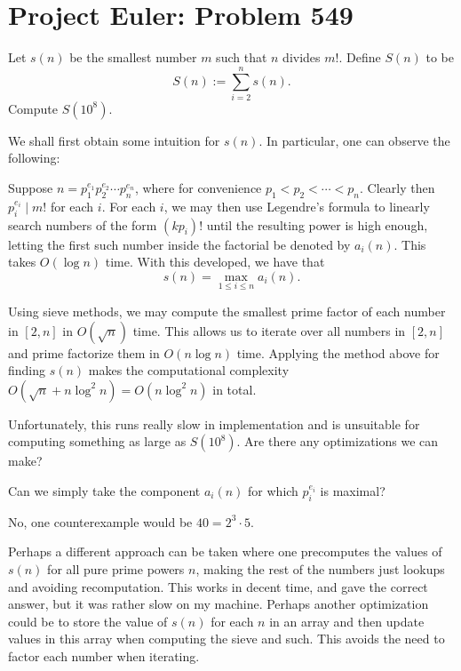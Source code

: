 \documentclass[a4paper, 12pt]{article}
\begin{document}
\section*{Project Euler: Problem 549}

\begin{chirpbox}
\begin{problem}
    Let \( s(n) \) be the smallest number \( m \) such that \( n \) divides \( m! \). Define \( S(n) \) to be
    \[
        S(n) := \sum_{i = 2}^{n} s(n)
    .\]
    Compute \( S(10^8) \).
\end{problem}
\end{chirpbox}

\begin{solution}
    We shall first obtain some intuition for \( s(n) \). In particular, one can observe the following:
    \begin{observation}
        Suppose \( n = p_1^{e_1} p_2^{e_2} \cdots p_n^{e_n} \), where for convenience \( p_1 < p_2 < \cdots < p_n \). Clearly then \( p_i^{e_i} \mid m! \) for each \( i \). For each \( i \), we may then use Legendre's formula to linearly search numbers of the form \( (kp_i)! \) until the resulting power is high enough, letting the first such number inside the factorial be denoted by \( a_i(n) \). This takes \( O(\log n) \) time. With this developed, we have that
        \[
            s(n) = \max_{1 \le i \le n} a_i(n)
        .\]
    \end{observation}
    Using sieve methods, we may compute the smallest prime factor of each number in \( [2, n] \) in \( O(\sqrt{n}) \) time. This allows us to iterate over all numbers in \( [2, n] \) and prime factorize them in \( O(n \log n) \) time. Applying the method above for finding \( s(n) \) makes the computational complexity \( O(\sqrt{n} + n \log^2 n) = O(n \log^2 n) \) in total.

    Unfortunately, this runs really slow in implementation and is unsuitable for computing something as large as \( S(10^8) \). Are there any optimizations we can make?
    \begin{idea}
        Can we simply take the component \( a_i(n) \) for which \( p_i^{e_i} \) is maximal?
    \end{idea}
    No, one counterexample would be \( 40 = 2^3 \cdot 5 \).

    Perhaps a different approach can be taken where one precomputes the values of \( s(n) \) for all pure prime powers \( n \), making the rest of the numbers just lookups and avoiding recomputation. This works in decent time, and gave the correct answer, but it was rather slow on my machine. Perhaps another optimization could be to store the value of \( s(n) \) for each \( n \) in an array and then update values in this array when computing the sieve and such. This avoids the need to factor each number when iterating.
\end{solution}
\end{document}
